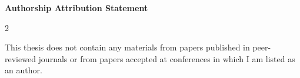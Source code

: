 \begin{titlepage}

\begin{center}
\Large{\bf{Authorship Attribution Statement}}
\end{center}

\vspace{0.2in}

\begin{spacing}{2}

This thesis does not contain any materials from papers published in peer-reviewed journals or from papers accepted at conferences in which I am listed as an author.

\end{spacing}

\vspace{2.5cm}

\begin{center}
	\makebox[4cm]{\dotfill}  \hfill \makebox[4cm]{\dotfill}\\
	      \hfill \makebox[4cm]{\thesisauthor}
\end{center}
\end{titlepage}
\newpage
